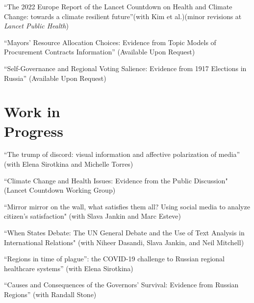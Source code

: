 \documentclass[margin,line,10.95pt]{res}
\begin{document}
\begin{resume}
\vspace*{-2.5mm}
{``The 2022 Europe Report of the Lancet Countdown on Health and Climate Change: towards a climate resilient future''}(with Kim et al.)(minor revisions at \textit{Lancet Public Health})

\vspace*{-2.5mm}

``Mayors’ Resource Allocation Choices: Evidence from Topic Models of Procurement
Contracts Information'' (Available Upon Request)

\vspace*{-2.5mm}

``Self-Governance and Regional Voting Salience: Evidence from 1917 Elections in Russia'' (Available Upon Request)

\section{\sc Work in \\ Progress}
``The trump of discord: visual information and affective polarization of media'' (with Elena Sirotkina and Michelle Torres)

\vspace*{-3.5mm}
``Climate Change and Health Issues: Evidence from the Public Discussion" (Lancet Countdown Working Group)

\vspace*{-3.5mm}
``Mirror mirror on the wall, what satisfies them all? Using social media to analyze citizen’s satisfaction" (with Slava Jankin and Marc Esteve)

\vspace*{-3.5mm}
``When States Debate: The UN General Debate and the Use of Text Analysis in International Relations" (with Niheer Dasandi, Slava Jankin, and Neil Mitchell)

\vspace*{-3.5mm}
``Regions in time of plague”: the COVID-19 challenge to Russian regional healthcare systems'' (with Elena Sirotkina) 

\vspace*{-3.5mm}
``Causes and Consequences of the Governors' Survival: Evidence from Russian Regions'' (with Randall Stone)




\end{resume}
\end{document}
